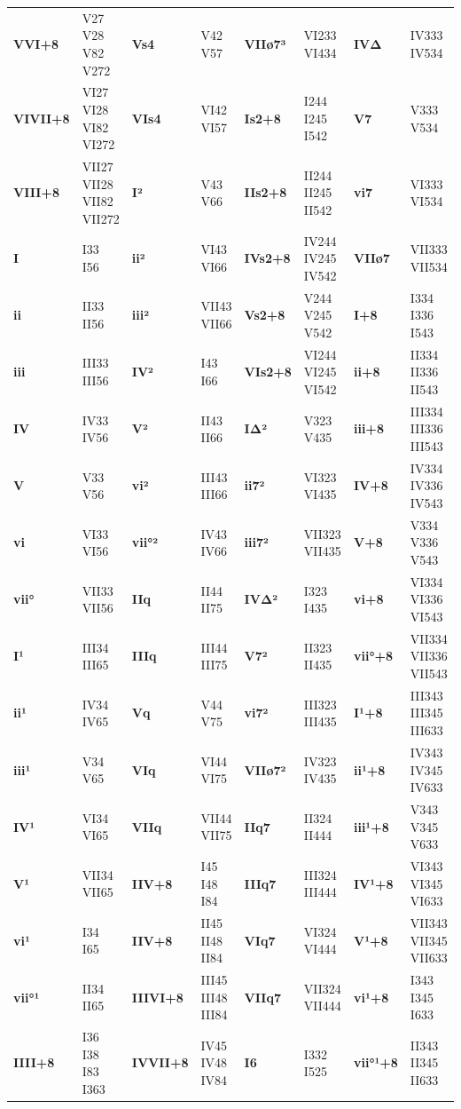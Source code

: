 \documentclass[12pt]{article}
\begin{document}
\begin{tabular}{@{}l l l l l l l l@{}}
\bfseries VVI+8 & V27  V28  V82  V272 & \bfseries Vs4 & V42  V57 & \bfseries VIIø7³ & VI233  VI434 & \bfseries IVΔ & IV333  IV534 \\
\bfseries VIVII+8 & VI27  VI28  VI82  VI272 & \bfseries VIs4 & VI42  VI57 & \bfseries Is2+8 & I244  I245  I542 & \bfseries V7 & V333  V534 \\
\bfseries VIII+8 & VII27  VII28  VII82  VII272 & \bfseries I² & V43  V66 & \bfseries IIs2+8 & II244  II245  II542 & \bfseries vi7 & VI333  VI534 \\
\bfseries I & I33  I56 & \bfseries ii² & VI43  VI66 & \bfseries IVs2+8 & IV244  IV245  IV542 & \bfseries VIIø7 & VII333  VII534 \\
\bfseries ii & II33  II56 & \bfseries iii² & VII43  VII66 & \bfseries Vs2+8 & V244  V245  V542 & \bfseries I+8 & I334  I336  I543 \\
\bfseries iii & III33  III56 & \bfseries IV² & I43  I66 & \bfseries VIs2+8 & VI244  VI245  VI542 & \bfseries ii+8 & II334  II336  II543 \\
\bfseries IV & IV33  IV56 & \bfseries V² & II43  II66 & \bfseries IΔ² & V323  V435 & \bfseries iii+8 & III334  III336  III543 \\
\bfseries V & V33  V56 & \bfseries vi² & III43  III66 & \bfseries ii7² & VI323  VI435 & \bfseries IV+8 & IV334  IV336  IV543 \\
\bfseries vi & VI33  VI56 & \bfseries vii°² & IV43  IV66 & \bfseries iii7² & VII323  VII435 & \bfseries V+8 & V334  V336  V543 \\
\bfseries vii° & VII33  VII56 & \bfseries IIq & II44  II75 & \bfseries IVΔ² & I323  I435 & \bfseries vi+8 & VI334  VI336  VI543 \\
\bfseries I¹ & III34  III65 & \bfseries IIIq & III44  III75 & \bfseries V7² & II323  II435 & \bfseries vii°+8 & VII334  VII336  VII543 \\
\bfseries ii¹ & IV34  IV65 & \bfseries Vq & V44  V75 & \bfseries vi7² & III323  III435 & \bfseries I¹+8 & III343  III345  III633 \\
\bfseries iii¹ & V34  V65 & \bfseries VIq & VI44  VI75 & \bfseries VIIø7² & IV323  IV435 & \bfseries ii¹+8 & IV343  IV345  IV633 \\
\bfseries IV¹ & VI34  VI65 & \bfseries VIIq & VII44  VII75 & \bfseries IIq7 & II324  II444 & \bfseries iii¹+8 & V343  V345  V633 \\
\bfseries V¹ & VII34  VII65 & \bfseries IIV+8 & I45  I48  I84 & \bfseries IIIq7 & III324  III444 & \bfseries IV¹+8 & VI343  VI345  VI633 \\
\bfseries vi¹ & I34  I65 & \bfseries IIV+8 & II45  II48  II84 & \bfseries VIq7 & VI324  VI444 & \bfseries V¹+8 & VII343  VII345  VII633 \\
\bfseries vii°¹ & II34  II65 & \bfseries IIIVI+8 & III45  III48  III84 & \bfseries VIIq7 & VII324  VII444 & \bfseries vi¹+8 & I343  I345  I633 \\
\bfseries IIII+8 & I36  I38  I83  I363 & \bfseries IVVII+8 & IV45  IV48  IV84 & \bfseries I6 & I332  I525 & \bfseries vii°¹+8 & II343  II345  II633 \\
\end{tabular}
\end{document}

